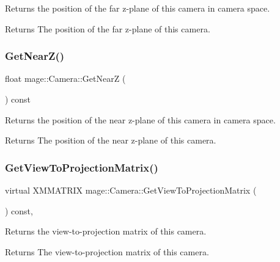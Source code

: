 Returns the position of the far z-\/plane of this camera in camera space.

\begin{DoxyReturn}{Returns}
The position of the far z-\/plane of this camera. 
\end{DoxyReturn}
\hypertarget{classmage_1_1_camera_a0f969370751ec76c51adf093f7bc092a}{}\label{classmage_1_1_camera_a0f969370751ec76c51adf093f7bc092a} 
\subsubsection{\texorpdfstring{Get\+Near\+Z()}{GetNearZ()}}
{\footnotesize\ttfamily float mage\+::\+Camera\+::\+Get\+NearZ (\begin{DoxyParamCaption}{ }\end{DoxyParamCaption}) const\hspace{0.3cm}{\ttfamily [noexcept]}}

Returns the position of the near z-\/plane of this camera in camera space.

\begin{DoxyReturn}{Returns}
The position of the near z-\/plane of this camera. 
\end{DoxyReturn}
\hypertarget{classmage_1_1_camera_ad72020c0bd6f8629bf8c8ba8bf583ed4}{}\label{classmage_1_1_camera_ad72020c0bd6f8629bf8c8ba8bf583ed4} 
\subsubsection{\texorpdfstring{Get\+View\+To\+Projection\+Matrix()}{GetViewToProjectionMatrix()}}
{\footnotesize\ttfamily virtual X\+M\+M\+A\+T\+R\+IX mage\+::\+Camera\+::\+Get\+View\+To\+Projection\+Matrix (\begin{DoxyParamCaption}{ }\end{DoxyParamCaption}) const\hspace{0.3cm}{\ttfamily [pure virtual]}, {\ttfamily [noexcept]}}

Returns the view-\/to-\/projection matrix of this camera.

\begin{DoxyReturn}{Returns}
The view-\/to-\/projection matrix of this camera. 
\end{DoxyReturn}


